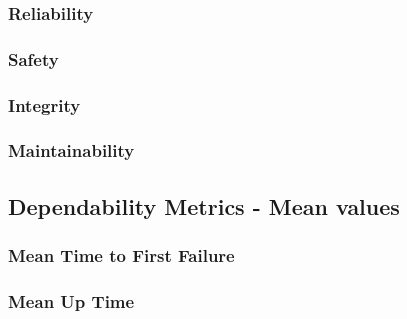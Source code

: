 \subsubsection{Reliability}

\subsubsection{Safety}

\subsubsection{Integrity}

\subsubsection{Maintainability}


\subsection{Dependability Metrics - Mean values} \label{background-dep-metrics-mean-values}

\subsubsection{Mean Time to First Failure}

\subsubsection{Mean Up Time}

